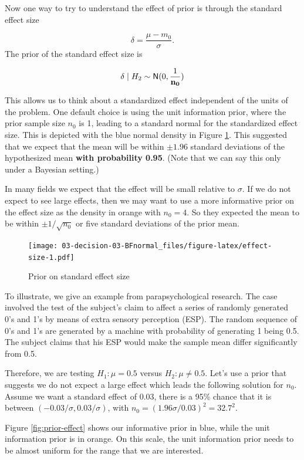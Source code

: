 \documentclass[]{book}
\theoremstyle{definition}
\theoremstyle{definition}
\theoremstyle{definition}
\theoremstyle{remark}
\let\BeginKnitrBlock\begin \let\EndKnitrBlock\end
\begin{document}
Now one way to try to understand the effect of prior is through the
standard effect size

\[\delta = \frac{\mu - m_0}{\sigma}.\] The prior of the standard effect
size is

\[\delta \mid   H_2  \sim \textsf{N}(0, \frac{1}{\mathbf{n_0}})\]

This allows us to think about a standardized effect independent of the
units of the problem. One default choice is using the unit information
prior, where the prior sample size \(n_0\) is 1, leading to a standard
normal for the standardized effect size. This is depicted with the blue
normal density in Figure \ref{fig:effect-size}. This suggested that we
expect that the mean will be within \(\pm 1.96\) standard deviations of
the hypothesized mean \textbf{with probability 0.95}. (Note that we can
say this only under a Bayesian setting.)

In many fields we expect that the effect will be small relative to
\(\sigma\). If we do not expect to see large effects, then we may want
to use a more informative prior on the effect size as the density in
orange with \(n_0 = 4\). So they expected the mean to be within
\(\pm 1/\sqrt{n_0}\) or five standard deviations of the prior mean.

\begin{figure}
\centering
\texttt{[image: 03-decision-03-BFnormal\_files/figure-latex/effect-size-1.pdf]}
\caption{\label{fig:effect-size}Prior on standard effect size}
\end{figure}

\BeginKnitrBlock{example}
\protect\hypertarget{exm:unnamed-chunk-1}{}{\label{exm:unnamed-chunk-1} }To
illustrate, we give an example from parapsychological research. The case
involved the test of the subject's claim to affect a series of randomly
generated 0's and 1's by means of extra sensory perception (ESP). The
random sequence of 0's and 1's are generated by a machine with
probability of generating 1 being 0.5. The subject claims that his ESP
would make the sample mean differ significantly from 0.5.
\EndKnitrBlock{example}

Therefore, we are testing \(H_1: \mu = 0.5\) versus
\(H_2: \mu \neq 0.5\). Let's use a prior that suggests we do not expect
a large effect which leads the following solution for \(n_0\). Assume we
want a standard effect of 0.03, there is a 95\% chance that it is
between \((-0.03/\sigma, 0.03/\sigma)\), with
\(n_0 = (1.96\sigma/0.03)^2 = 32.7^2\).

Figure \ref{fig:prior-effect} shows our informative prior in blue, while
the unit information prior is in orange. On this scale, the unit
information prior needs to be almost uniform for the range that we are
interested.
\end{document}
